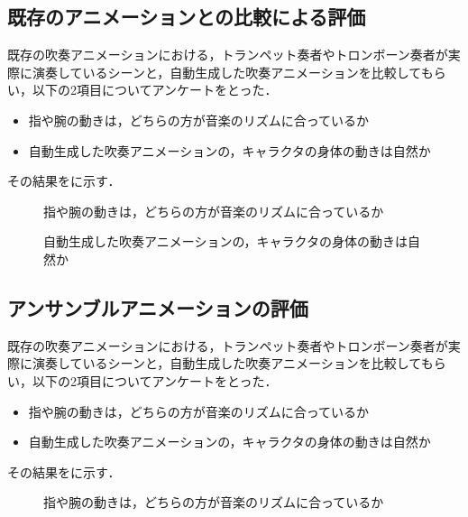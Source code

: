 \subsection{既存のアニメーションとの比較による評価}
既存の吹奏アニメーションにおける，トランペット奏者やトロンボーン奏者が実際に演奏しているシーンと，自動生成した吹奏アニメーションを比較してもらい，以下の2項目についてアンケートをとった．
\begin{itemize}
	\item 指や腕の動きは，どちらの方が音楽のリズムに合っているか
	\item 自動生成した吹奏アニメーションの，キャラクタの身体の動きは自然か
\end{itemize}
その結果をに示す．
\begin{figure}[t]
	\centering
	\hspace{2mm}
	\caption{指や腕の動きは，どちらの方が音楽のリズムに合っているか}
	\label{fig:Q2-tp}
\end{figure}

\begin{figure}[t]
	\centering
	\caption{自動生成した吹奏アニメーションの，キャラクタの身体の動きは自然か}
	\label{fig:Q2-tb}
\end{figure}

\subsection{アンサンブルアニメーションの評価}
既存の吹奏アニメーションにおける，トランペット奏者やトロンボーン奏者が実際に演奏しているシーンと，自動生成した吹奏アニメーションを比較してもらい，以下の2項目についてアンケートをとった．
\begin{itemize}
	\item 指や腕の動きは，どちらの方が音楽のリズムに合っているか
	\item 自動生成した吹奏アニメーションの，キャラクタの身体の動きは自然か
\end{itemize}
その結果をに示す．
\begin{figure}[t]
	\centering
	\hspace{2mm}
	\caption{指や腕の動きは，どちらの方が音楽のリズムに合っているか}
	\label{fig:Q2-tp}
\end{figure}

